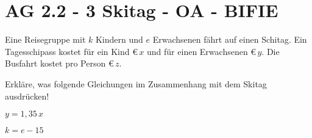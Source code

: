 \section{AG 2.2 - 3 Skitag  - OA - BIFIE}

\begin{beispiel}[AG 2.2]{1} %
	
	Eine Reisegruppe mit $k$ Kindern und $e$ Erwachsenen fährt auf einen Schitag. Ein Tagesschipass kostet für ein Kind \euro\,$x$ und für einen Erwachsenen \euro\,$y$. Die Busfahrt kostet pro Person \euro\,$z$. 

\leer

Erkläre, was folgende Gleichungen im Zusammenhang mit dem Skitag ausdrücken!

$y=1,35\,x \quad$ 	\leer

$k=e-15 \quad$ 
\end{beispiel}